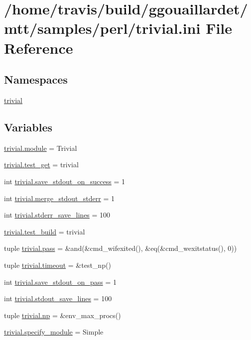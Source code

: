 \hypertarget{trivial_8ini}{\section{/home/travis/build/ggouaillardet/mtt/samples/perl/trivial.ini File Reference}
\label{trivial_8ini}
}
\subsection*{Namespaces}
\begin{DoxyCompactItemize}
\item 
\hyperlink{namespacetrivial}{trivial}
\end{DoxyCompactItemize}
\subsection*{Variables}
\begin{DoxyCompactItemize}
\item 
\hyperlink{namespacetrivial_a3e713ea5d6e77bf165eeaafc02275430}{trivial.\-module} = Trivial
\item 
\hyperlink{namespacetrivial_afe75cace659f04749ee3f7c818152b7b}{trivial.\-test\-\_\-get} = trivial
\item 
int \hyperlink{namespacetrivial_af272dc5ab194f706f77eeb74de7b8c97}{trivial.\-save\-\_\-stdout\-\_\-on\-\_\-success} = 1
\item 
int \hyperlink{namespacetrivial_a8c1d5357654e053cf4d0b8a7f48ff13b}{trivial.\-merge\-\_\-stdout\-\_\-stderr} = 1
\item 
int \hyperlink{namespacetrivial_af6ee4456e84c354e7845aae7ea24d022}{trivial.\-stderr\-\_\-save\-\_\-lines} = 100
\item 
\hyperlink{namespacetrivial_aa612b0f8daffd666959f885b6ba54cd0}{trivial.\-test\-\_\-build} = trivial
\item 
tuple \hyperlink{namespacetrivial_a65b4003f52ce4fa5d324695f54c1e3b3}{trivial.\-pass} = \&and(\&cmd\-\_\-wifexited(), \&eq(\&cmd\-\_\-wexitstatus(), 0))
\item 
tuple \hyperlink{namespacetrivial_a8ce5c7e487f1c21edda391cc47830f5e}{trivial.\-timeout} = \&test\-\_\-np()
\item 
int \hyperlink{namespacetrivial_aefbe39eb9fcb8a58d4e04dd980e35062}{trivial.\-save\-\_\-stdout\-\_\-on\-\_\-pass} = 1
\item 
int \hyperlink{namespacetrivial_aee208868790b8c2d6d9f48ad238aa6c5}{trivial.\-stdout\-\_\-save\-\_\-lines} = 100
\item 
tuple \hyperlink{namespacetrivial_adfe4da0e2d8f3078b198c0f76ee394dd}{trivial.\-np} = \&env\-\_\-max\-\_\-procs()
\item 
\hyperlink{namespacetrivial_af5dae1522345f303cfb4527587cd5361}{trivial.\-specify\-\_\-module} = Simple
\end{DoxyCompactItemize}
